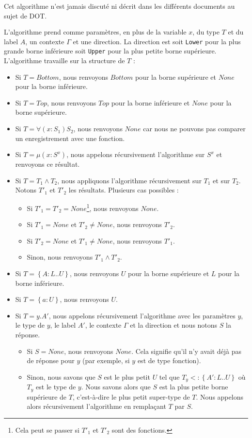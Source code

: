 Cet algorithme n'est jamais discuté ni décrit dans les différents
documents au sujet de DOT.

L'algorithme prend comme
paramètres, en plus de la variable $x$, du type $T$ et du label $A$, un contexte
$\Gamma$ et une direction. La direction est soit \verb|Lower| pour la
plus grande borne inférieure soit \verb|Upper| pour la plus petite borne
supérieure. L'algorithme travaille sur la structure de $T$ :

\begin{itemize}
\item Si $T = Bottom$, nous renvoyons $Bottom$ pour la borne supérieure et
  $None$ pour la borne inférieure.
\item Si $T = Top$, nous renvoyons $Top$ pour la borne inférieure et
  $None$ pour la borne supérieure.
\item Si $T = \forall(x : S_{1}) S_{2}$, nous renvoyons $None$ car nous
  ne pouvons pas comparer un enregistrement avec une fonction.
\item Si $T = \mu(x : S^{x})$, nous appelons récursivement l'algorithme sur
  $S^{x}$ et renvoyons ce résultat.
\item Si $T = T_{1} \wedge T_{2}$, nous
  appliquons l'algorithme récursivement sur $T_{1}$ et sur $T_{2}$. Notons
  $T'_{1}$ et $T'_{2}$ les résultats. Plusieurs cas possibles :
  \begin{itemize}
  \item Si $T'_{1} = T'_{2} = None$\footnote{Cela peut se
    passer si $T'_{1}$ et $T'_{2}$ sont des fonctions.}, nous renvoyons $None$.
  \item Si $T'_{1} = None$ et $T'_{2} \neq None$, nous renvoyons $T'_{2}$.
  \item Si $T'_{2} = None$ et $T'_{1} \neq None$, nous renvoyons $T'_{1}$.
  \item Sinon, nous renvoyons $T'_{1} \wedge T'_{2}$.
  \end{itemize}
\item Si $T = \left\{ A : L .. U \right\}$, nous renvoyons $U$ pour la borne
  supérieure et $L$ pour la borne inférieure.
\item Si $T = \left\{ a : U \right\}$, nous renvoyons $U$.
\item Si $T = y.A'$, nous appelons récursivement l'algorithme avec les paramètres
  $y$, le type de $y$, le label $A'$, le contexte $\Gamma$ et la direction et
  nous notons $S$ la réponse.
  \begin{itemize}
  \item Si $S = None$, nous renvoyons $None$. Cela signifie qu'il n'y avait déjà
  pas de réponse pour $y$ (par exemple, si $y$ est de type fonction).
  \item Sinon, nous savons que $S$ est le plus petit $U$ tel que $T_{y} <:
    \left\{ A' 
    : L .. U \right\}$ où $T_{y}$ est le type de $y$. Nous savons alors que $S$
  est la plus petite borne supérieure de $T$, c'est-à-dire le plus petit super-type de $T$. Nous
  appelons alors récursivement l'algorithme en remplaçant $T$ par $S$.
  \end{itemize}
\end{itemize}

